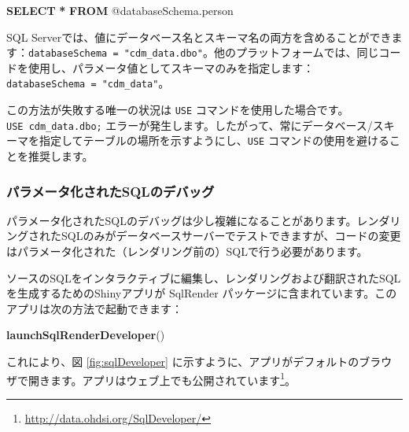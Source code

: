 \documentclass[
  11pt]{book}
\newenvironment{Shaded}{\begin{snugshade}}{\end{snugshade}}
\newcommand{\FunctionTok}[1]{\textcolor[rgb]{0.13,0.29,0.53}{\textbf{#1}}}
\newcommand{\KeywordTok}[1]{\textcolor[rgb]{0.13,0.29,0.53}{\textbf{#1}}}
\newcommand{\NormalTok}[1]{#1}
\newcommand{\OperatorTok}[1]{\textcolor[rgb]{0.81,0.36,0.00}{\textbf{#1}}}
\theoremstyle{definition}
\theoremstyle{definition}
\theoremstyle{definition}
\theoremstyle{definition}
\theoremstyle{remark}
\begin{document}
\begin{Shaded}
\begin{Highlighting}[]
\KeywordTok{SELECT} \OperatorTok{*} \KeywordTok{FROM}\NormalTok{ @databaseSchema.person}
\end{Highlighting}
\end{Shaded}

SQL Serverでは、値にデータベース名とスキーマ名の両方を含めることができます：\texttt{databaseSchema\ =\ "cdm\_data.dbo"}。他のプラットフォームでは、同じコードを使用し、パラメータ値としてスキーマのみを指定します：\texttt{databaseSchema\ =\ "cdm\_data"}。

この方法が失敗する唯一の状況は \texttt{USE} コマンドを使用した場合です。\texttt{USE\ cdm\_data.dbo;} エラーが発生します。したがって、常にデータベース/スキーマを指定してテーブルの場所を示すようにし、\texttt{USE} コマンドの使用を避けることを推奨します。

\subsubsection*{パラメータ化されたSQLのデバッグ}\label{ux30d1ux30e9ux30e1ux30fcux30bfux5316ux3055ux308cux305fsqlux306eux30c7ux30d0ux30c3ux30b0}

パラメータ化されたSQLのデバッグは少し複雑になることがあります。レンダリングされたSQLのみがデータベースサーバーでテストできますが、コードの変更はパラメータ化された（レンダリング前の）SQLで行う必要があります。 

ソースのSQLをインタラクティブに編集し、レンダリングおよび翻訳されたSQLを生成するためのShinyアプリが SqlRender パッケージに含まれています。このアプリは次の方法で起動できます：

\begin{Shaded}
\begin{Highlighting}[]
\FunctionTok{launchSqlRenderDeveloper}\NormalTok{()}
\end{Highlighting}
\end{Shaded}

これにより、図 \ref{fig:sqlDeveloper} に示すように、アプリがデフォルトのブラウザで開きます。アプリはウェブ上でも公開されています\footnote{\url{http://data.ohdsi.org/SqlDeveloper/}}。
\end{document}
